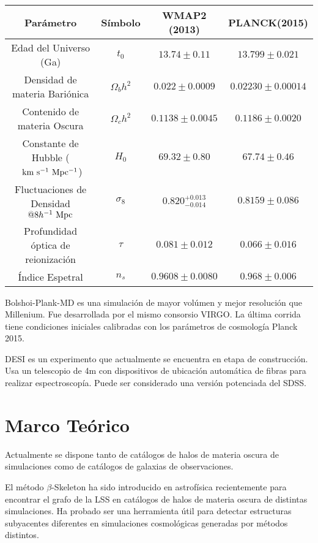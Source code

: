 \documentclass[preprint]{aastex62}
\begin{document}
  \begin{table}[htb]
    \begin{tabular}{|cc|cc| }
      \hline
      Parámetro & Símbolo & WMAP2 (2013)& PLANCK(2015)  \\
      \hline
      Edad del Universo (Ga) & $t_0$ & $13.74\pm0.11$ & $13.799\pm0.021$ \\
      Densidad de materia Bariónica & $\Omega_b h^2$ & $0.022 \pm 0.0009$ & $0.02230\pm 0.00014$ \\
      Contenido de materia Oscura & $\Omega_c h^2$ & $0.1138\pm0.0045$ & $0.1186\pm0.0020$\\
      Constante de Hubble ($\rm~km~s^{-1}~Mpc^{-1}$) & $H_0 $ & $ 69.32 \pm 0.80 $  & $ 67.74 \pm 0.46 $\\
      Fluctuaciones de Densidad $@ 8 h^{-1} \rm~Mpc$ & $\sigma_8$ & $0.820^{+0.013}_{-0.014}$ & $0.8159 \pm 0.086$ \\  
      Profundidad óptica de reionización & $\tau$ & $ 0.081\pm0.012$  & $0.066 \pm 0.016$ \\
      Índice Espetral & $n_s$ & $ 0.9608 \pm 0.0080 $  & $ 0.968 \pm 0.006 $ \\
      \hline
    \end{tabular}
  \end{table}
  
  
  Bolshoi-Plank-MD es una simulación de mayor volúmen y mejor resolución que Millenium. Fue
  desarrollada por el mismo consorsio VIRGO. La última corrida tiene condiciones iniciales calibradas
  con los parámetros de cosmología Planck 2015.

  \medskip

  DESI es un experimento que actualmente se encuentra en etapa de construcción. Usa un telescopio de 4m con
  dispositivos de ubicación automática de fibras para realizar espectroscopía. Puede ser considerado una versión
  potenciada del SDSS.

  \section{Marco Teórico}

  Actualmente se dispone tanto de catálogos de halos de materia oscura de simulaciones como de catálogos de
  galaxias de observaciones.


  El método $\beta$-Skeleton ha sido introducido en astrofísica recientemente \citep{Fang2018} para
  encontrar el grafo de la LSS en catálogos de halos de materia oscura de distintas simulaciones.
  Ha probado ser una herramienta útil para detectar estructuras subyacentes diferentes en
  simulaciones cosmológicas generadas por métodos distintos.
\end{document}
